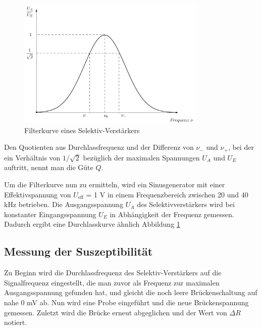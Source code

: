 \begin{figure}[H]
 \includegraphics[width=0.8\textwidth]{pics/filterkurve.png}
 \caption{Filterkurve eines Selektiv-Verstärkers}
 \label{picfilter}
\end{figure}

Den Quotienten aus Durchlassfrequenz und der Differenz von $\nu_-$ und $\nu_+$, bei der ein Verhältnis von $1/\sqrt{2}$ bezüglich der 
maximalen Spannungen $U_A$ und $U_E$ auftritt, nennt man die Güte $Q$.

Um die Filterkurve nun zu ermitteln, wird ein Sinusgenerator mit einer Effektivspannung von $U_{\text{eff}}$ = 1 V in einem Frequenzbereich 
zwischen 20 und 40 kHz betrieben. Die Ausgangsspannung $U_A$ des Selektivverstärkers wird bei konstanter Eingangsspannung $U_E$ in Abhängigkeit
der Frequenz gemessen. Dadurch ergibt eine Durchlasskurve ähnlich Abbildung \ref{picfilter}

\subsection{Messung der Suszeptibilität}
Zu Beginn wird die Durchlassfrequenz des Selektiv-Verstärkers auf die Signalfrequenz eingestellt, die man zuvor als Frequenz zur maximalen
Ausgangsspannung gefunden hat, und gleicht die noch leere Brückenschaltung auf nahe 0 mV ab. Nun wird eine Probe eingeführt und die
neue Brückenspannung gemessen. Zuletzt wird die Brücke erneut abgeglichen und der Wert von $\Delta R$ notiert. 

